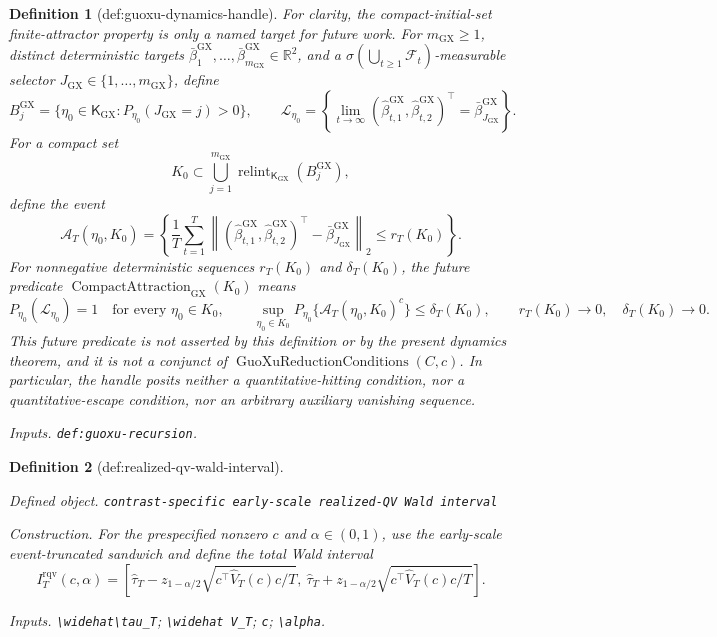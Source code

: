 \documentclass{article}
\newtheorem{definition}{Definition}
\begin{document}
\begin{definition}[def:guoxu-dynamics-handle]
For clarity, the compact-initial-set finite-attractor property is only a named target for future work. For \(m_{\mathrm{GX}}\geq1\), distinct deterministic targets \(\bar\beta^{\mathrm{GX}}_1,\ldots,\bar\beta^{\mathrm{GX}}_{m_{\mathrm{GX}}}\in\mathbb R^2\), and a \(\sigma(\bigcup_{t\geq1}\mathcal F_t)\)-measurable selector \(J_{\mathrm{GX}}\in\{1,\ldots,m_{\mathrm{GX}}\}\), define
\[
B^{\mathrm{GX}}_j=\{\eta_0\in\mathsf K_{\mathrm{GX}}:P_{\eta_0}(J_{\mathrm{GX}}=j)>0\},
\qquad
\mathcal L_{\eta_0}=\left\{\lim_{t\to\infty}
(\widehat\beta^{\mathrm{GX}}_{t,1},\widehat\beta^{\mathrm{GX}}_{t,2})^\top
=\bar\beta^{\mathrm{GX}}_{J_{\mathrm{GX}}}\right\}.
\]
For a compact set
\[
K_0\subset\bigcup_{j=1}^{m_{\mathrm{GX}}}
\operatorname{relint}_{\mathsf K_{\mathrm{GX}}}(B^{\mathrm{GX}}_j),
\]
define the event
\[
\mathcal A_T(\eta_0,K_0)=\left\{
\frac1T\sum_{t=1}^T
\left\|(\widehat\beta^{\mathrm{GX}}_{t,1},\widehat\beta^{\mathrm{GX}}_{t,2})^\top
-\bar\beta^{\mathrm{GX}}_{J_{\mathrm{GX}}}\right\|_2
\leq r_T(K_0)\right\}.
\]
For nonnegative deterministic sequences \(r_T(K_0)\) and \(\delta_T(K_0)\), the future predicate \(\operatorname{CompactAttraction}_{\mathrm{GX}}(K_0)\) means
\[
P_{\eta_0}(\mathcal L_{\eta_0})=1\quad\text{for every }\eta_0\in K_0,
\qquad
\sup_{\eta_0\in K_0}P_{\eta_0}\{\mathcal A_T(\eta_0,K_0)^c\}
\leq\delta_T(K_0),
\qquad
r_T(K_0)\to0,\quad\delta_T(K_0)\to0.
\]
This future predicate is not asserted by this definition or by the present dynamics theorem, and it is not a conjunct of \(\operatorname{GuoXuReductionConditions}(C,c)\). In particular, the handle posits neither a quantitative-hitting condition, nor a quantitative-escape condition, nor an arbitrary auxiliary vanishing sequence.
\par\smallskip\noindent\emph{Inputs.} \texttt{def:\allowbreak{}guoxu-\allowbreak{}recursion}.
\end{definition}

\begin{definition}[def:realized-qv-wald-interval]\label{def:realized-qv-wald-interval}
\par\smallskip\noindent\emph{Defined object.} \texttt{contrast-\allowbreak{}specific early-\allowbreak{}scale realized-\allowbreak{}QV Wald interval}
\par\smallskip\noindent\emph{Construction.} For the prespecified nonzero \(c\) and \(\alpha\in(0,1)\), use the early-scale event-truncated sandwich and define the total Wald interval
\[
 I_T^{\mathrm{rqv}}(c,\alpha)=
 \left[\widehat\tau_T-z_{1-\alpha/2}
 \sqrt{c^\top\widehat V_T(c)c/T},\ 
 \widehat\tau_T+z_{1-\alpha/2}
 \sqrt{c^\top\widehat V_T(c)c/T}\right].
\]
\par\smallskip\noindent\emph{Inputs.} \texttt{\textbackslash{}\allowbreak{}widehat\textbackslash{}\allowbreak{}tau\_\allowbreak{}T}; \texttt{\textbackslash{}\allowbreak{}widehat V\_\allowbreak{}T}; \texttt{c}; \texttt{\textbackslash{}\allowbreak{}alpha}.
\end{definition}
\end{document}
